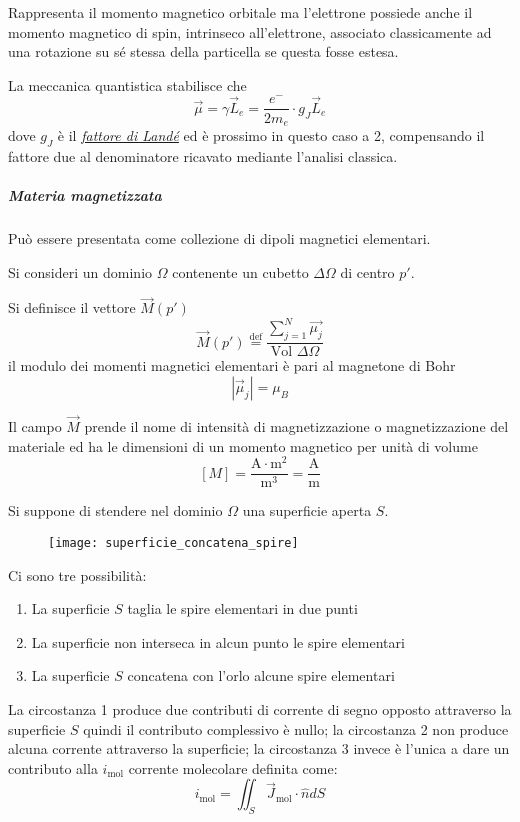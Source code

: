 Rappresenta il momento magnetico orbitale ma l'elettrone possiede anche il momento 
magnetico di spin, intrinseco all'elettrone, associato classicamente ad una rotazione su
sé stessa della particella se questa fosse estesa.

La meccanica quantistica stabilisce che 
$$
\vec{\mu} = \gamma \vec{L}_e = \frac{e^-}{2 m_e}\cdot g_J \vec{L}_e
$$
dove $g_J$ è il \href{https://it.wikipedia.org/wiki/Fattore_di_Land\%C3\%A9}{\textit{fattore di Landé}} ed è prossimo in questo caso a 2, compensando il fattore due al 
denominatore
ricavato mediante l'analisi classica.

\subparagraph{Materia magnetizzata}
Può essere presentata come collezione di dipoli magnetici elementari.

Si consideri un dominio $\Omega$ contenente un cubetto $\Delta \Omega$ di centro $p'$.

Si definisce il vettore $\vec{M}(p')$
$$
\vec{M}(p') \stackrel{\text{def}}{=} \frac{\sum_{j=1}^N \vec{\mu_j}}{\text{Vol }\Delta\Omega}
$$
il modulo dei momenti magnetici elementari è pari al magnetone di Bohr
$$
\left|\vec{\mu}_j\right| = \mu_B
$$

Il campo $\vec{M}$ prende il nome di intensità di magnetizzazione o magnetizzazione del 
materiale ed ha le dimensioni di un momento magnetico per unità di volume
$$
[M] = \frac{\si{\ampere}\cdot\si{\meter^2}}{\si{\meter^3}} = \frac{\si{\ampere}}{\si{\meter}}
$$
\newpage

Si suppone di stendere nel dominio $\Omega$ una superficie aperta $S$.
\begin{figure}[H]
\centering
\texttt{[image: superficie\_concatena\_spire]}
\end{figure}
Ci sono tre possibilità:
\begin{enumerate}
\item La superficie $S$ taglia le spire elementari in due punti
\item La superficie non interseca in alcun punto le spire elementari
\item La superficie $S$ concatena con l'orlo alcune spire elementari
\end{enumerate}
La circostanza 1 produce due contributi di corrente di segno opposto attraverso la superficie $S$ quindi il contributo complessivo è nullo; 
la circostanza 2 non produce alcuna corrente attraverso la superficie; la circostanza 
3 invece è l'unica a dare un contributo alla $i_{\text{mol}}$ corrente molecolare
definita come:
$$
i_{\text{mol}} = \iint_S \vec{J}_{\text{mol}} \cdot \hat{n} dS
$$

